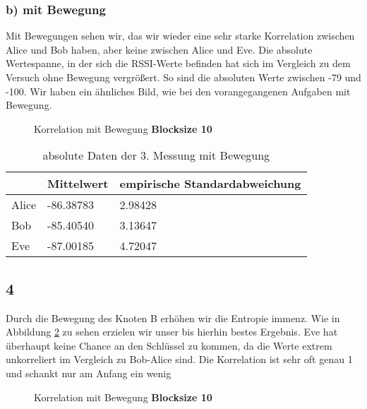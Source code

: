 \documentclass[12pt,a4paper]{article}
\begin{document}
\subsubsection*{b) mit Bewegung}
Mit Bewegungen sehen wir, das wir wieder eine sehr starke Korrelation zwischen Alice und Bob haben, aber keine zwischen Alice und Eve. Die absolute Wertespanne, in der sich die RSSI-Werte befinden hat sich im Vergleich zu dem Versuch ohne Bewegung vergrößert. So sind die absoluten Werte zwischen -79 und -100. Wir haben ein ähnliches Bild, wie bei den vorangegangenen Aufgaben mit Bewegung. 
\begin{figure}[H]
\centering
{} \qquad
{}
\caption{Korrelation mit Bewegung \textbf{Blocksize 10}}
\label{fig:3_b_m}
\end{figure}

\begin{table}[H]
\centering
\begin{tabular}{l|l|l}
& Mittelwert & empirische Standardabweichung \\
\hline
Alice & -86.38783 & 2.98428 \\
\hline
Bob & -85.40540 & 3.13647 \\
\hline
Eve & -87.00185 & 4.72047 \\
\end{tabular}
\caption{absolute Daten der 3. Messung mit Bewegung}
\end{table}

\subsection*{4}
Durch die Bewegung des Knoten B erhöhen wir die Entropie immenz. Wie in Abbildung \ref{fig:4} zu sehen erzielen wir unser bis hierhin bestes Ergebnis. Eve hat überhaupt keine Chance an den Schlüssel zu kommen, da die Werte extrem unkorreliert im Vergleich zu Bob-Alice sind. Die Korrelation ist sehr oft genau 1 und schankt nur am Anfang ein wenig
\begin{figure}[H]
\centering
{} \qquad
{}
\caption{Korrelation mit Bewegung \textbf{Blocksize 10}}
\label{fig:4}
\end{figure}
\end{document}
